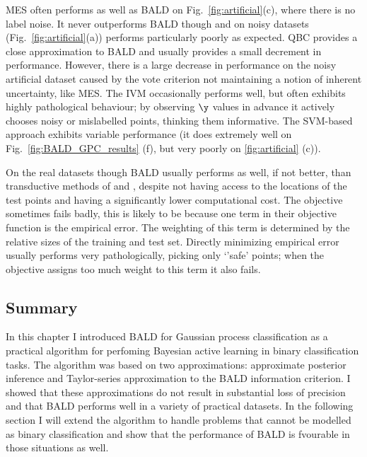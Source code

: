 MES often performs as well as BALD \eg on Fig.\ \ref{fig:artificial}(c), where there is no label noise. It never outperforms BALD though and on noisy datasets (\eg Fig.\ \ref{fig:artificial}(a)) performs particularly poorly as expected. QBC provides a close approximation to BALD and usually provides a small decrement in performance. However, there is a large decrease in performance on the noisy artificial dataset caused by the vote criterion not maintaining a notion of inherent uncertainty, like MES. The IVM occasionally performs well, but often exhibits highly pathological behaviour; by observing $\y$ values in advance it actively chooses noisy or mislabelled points, thinking them informative. The SVM-based approach exhibits variable performance (it does extremely well on Fig.\ \ref{fig:BALD_GPC_results} (f), but very poorly on \ref{fig:artificial} (c)).

On the real datasets though BALD usually performs as well, if not better, than transductive methods of \citet{Kapoor2007} and \citet{Zhu2003}, despite not having access to the locations of the test points and having a significantly lower computational cost. The \citep{Kapoor2007} objective sometimes fails badly, this is likely to be because one term in their objective function is the empirical error. The weighting of this term is determined by the relative sizes of the training and test set. Directly minimizing empirical error usually performs very pathologically, picking only `'safe' points; when the \citep{Kapoor2007} objective assigns too much weight to this term it also fails.


\subsection{Summary}

In this chapter I introduced BALD for Gaussian process classification as a practical algorithm for perfoming Bayesian active learning in binary classification tasks. The algorithm was based on two approximations: approximate posterior inference and Taylor-series approximation to the BALD information criterion. I showed that these approximations do not result in substantial loss of precision and that BALD performs well in a variety of practical datasets. In the following section I will extend the algorithm to handle problems that cannot be modelled as binary classification and show that the performance of BALD is fvourable in those situations as well.

